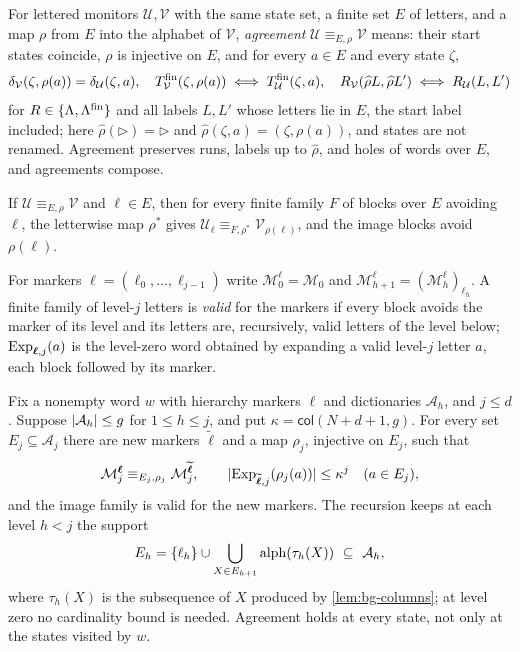 For lettered monitors $\mathcal U,\mathcal V$ with the same state set, a finite
set $E$ of letters, and a map $\rho$ from $E$ into the alphabet of $\mathcal V$,
\emph{agreement} $\mathcal U\equiv_{E,\rho}\mathcal V$ means: their start states
coincide, $\rho$ is injective on $E$, and for every $a\in E$ and every state
$\zeta$,
\begin{equation}\label{eq:bg-agreement}
 \delta_{\mathcal V}(\zeta,\rho(a))=\delta_{\mathcal U}(\zeta,a),\quad
 T^{\mathrm{fin}}_{\mathcal V}(\zeta,\rho(a))\iff T^{\mathrm{fin}}_{\mathcal U}(\zeta,a),\quad
 R_{\mathcal V}(\widehat\rho L,\widehat\rho L')\iff R_{\mathcal U}(L,L')
\end{equation}
for $R\in\{\Lambda,\Lambda^{\mathrm{fin}}\}$ and all labels $L,L'$ whose letters lie in $E$,
the start label included; here $\widehat\rho(\triangleright)=\triangleright$ and
$\widehat\rho(\zeta,a)=(\zeta,\rho(a))$, and states are not renamed. Agreement
preserves runs, labels up to $\widehat\rho$, and holes of words over $E$, and
agreements compose.

\begin{lemma}\label{lem:bg-agreement}
If $\mathcal U\equiv_{E,\rho}\mathcal V$ and $\ell\in E$, then for every finite
family $F$ of blocks over $E$ avoiding $\ell$, the letterwise map $\rho^*$ gives
$\mathcal U_\ell\equiv_{F,\rho^*}\mathcal V_{\rho(\ell)}$, and the image blocks
avoid $\rho(\ell)$.
\end{lemma}

For markers $\boldsymbol\ell=(\ell_0,\ldots,\ell_{j-1})$ write
$\mathcal M^{\boldsymbol\ell}_0=\mathcal M_0$ and
$\mathcal M^{\boldsymbol\ell}_{h+1}=(\mathcal M^{\boldsymbol\ell}_h)_{\ell_h}$. A
finite family of level-$j$ letters is \emph{valid} for the markers if every
block avoids the marker of its level and its letters are, recursively, valid
letters of the level below; $\operatorname{Exp}_{\boldsymbol\ell,j}(a)$ is the level-zero
word obtained by expanding a valid level-$j$ letter $a$, each block followed by
its marker.

\begin{lemma}\label{lem:bg-compression}
Fix a nonempty word $w$ with hierarchy markers $\boldsymbol\ell$ and
dictionaries $\mathcal A_h$, and $j\le d$. Suppose $\lvert \mathcal A_h\rvert\le g$ for
$1\le h\le j$, and put $\kappa=\mathsf{col}(N+d+1,g)$. For every set
$E_j\subseteq\mathcal A_j$ there are new markers $\widetilde{\boldsymbol\ell}$
and a map $\rho_j$, injective on $E_j$, such that
\[
 \mathcal M^{\boldsymbol\ell}_j\equiv_{E_j,\rho_j}
 \mathcal M^{\widetilde{\boldsymbol\ell}}_j,
 \qquad
 \lvert \operatorname{Exp}_{\widetilde{\boldsymbol\ell},j}(\rho_j(a))\rvert\le\kappa^j\quad(a\in E_j),
\]
and the image family is valid for the new markers. The recursion keeps at each
level $h<j$ the support
\[
 E_h=\{\ell_h\}\cup\bigcup_{X\in E_{h+1}}\operatorname{alph}(\tau_h(X))\ \subseteq\ \mathcal A_h,
\]
where $\tau_h(X)$ is the subsequence of $X$ produced by \cref{lem:bg-columns};
at level zero no cardinality bound is needed. Agreement holds at every state,
not only at the states visited by $w$.
\end{lemma}

